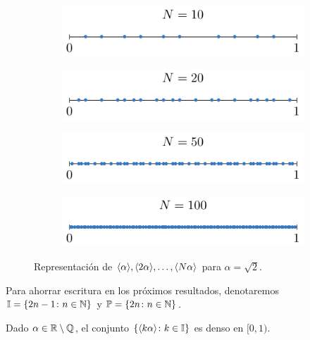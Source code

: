 \documentclass[a4paper, 12pt]{book}
\begin{document}
\begin{figure}[H]
\centering
\begin{subfigure}[b]{0.49\textwidth}
    \centering
    \includegraphics{./plot9/main.pdf}
\end{subfigure}
\begin{subfigure}[b]{0.49\textwidth}
    \centering
    \includegraphics{./plot10/main.pdf}
\end{subfigure}
\par\bigskip
\begin{subfigure}[b]{0.49\textwidth}
    \centering
    \includegraphics{./plot11/main.pdf}
\end{subfigure}
\begin{subfigure}[b]{0.49\textwidth}
    \centering
    \includegraphics{./plot12/main.pdf}
\end{subfigure}
\caption{Representación de $\langle \alpha \rangle,\langle 2\alpha \rangle,\mathellipsis,\langle N\alpha \rangle$ para $\alpha = \sqrt{2}$.}
\end{figure}

Para ahorrar escritura en los próximos resultados, denotaremos $\mathbb I = \{2n-1 \colon n \in \mathbb N\}$ y $\mathbb{P} = \{2n \colon n \in \mathbb N\}$.

\begin{lemma}
    Dado $\alpha \in \mathbb R \setminus \mathbb Q$, el conjunto $\{\langle k\alpha \rangle \colon k \in \mathbb I\}$ es denso en $[0,1)$.
\end{lemma}
\end{document}
